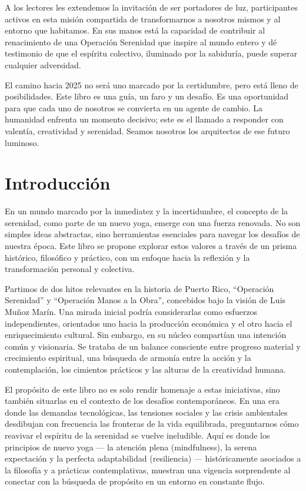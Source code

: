 \documentclass[
]{book}
\begin{document}
A los lectores les extendemos la invitación de ser portadores de luz, participantes activos en esta misión compartida de transformarnos a nosotros mismos y al entorno que habitamos. En sus manos está la capacidad de contribuir al renacimiento de una Operación Serenidad que inspire al mundo entero y dé testimonio de que el espíritu colectivo, iluminado por la sabiduría, puede superar cualquier adversidad.

El camino hacia 2025 no será uno marcado por la certidumbre, pero está lleno de posibilidades. Este libro es una guía, un faro y un desafío. Es una oportunidad para que cada uno de nosotros se convierta en un agente de cambio. La humanidad enfrenta un momento decisivo; este es el llamado a responder con valentía, creatividad y serenidad. Seamos nosotros los arquitectos de ese futuro luminoso.

\chapter*{Introducción}\label{introducciuxf3n}

En un mundo marcado por la inmediatez y la incertidumbre, el concepto de la serenidad, como parte de un nuevo yoga, emerge con una fuerza renovada. No son simples ideas abstractas, sino herramientas esenciales para navegar los desafíos de nuestra época. Este libro se propone explorar estos valores a través de un prisma histórico, filosófico y práctico, con un enfoque hacia la reflexión y la transformación personal y colectiva.

Partimos de dos hitos relevantes en la historia de Puerto Rico, ``Operación Serenidad'' y ``Operación Manos a la Obra'', concebidos bajo la visión de Luis Muñoz Marín. Una mirada inicial podría considerarlas como esfuerzos independientes, orientados uno hacia la producción económica y el otro hacia el enriquecimiento cultural. Sin embargo, en su núcleo compartían una intención común y visionaria. Se trataba de un balance consciente entre progreso material y crecimiento espiritual, una búsqueda de armonía entre la acción y la contemplación, los cimientos prácticos y las alturas de la creatividad humana.

El propósito de este libro no es solo rendir homenaje a estas iniciativas, sino también situarlas en el contexto de los desafíos contemporáneos. En una era donde las demandas tecnológicas, las tensiones sociales y las crisis ambientales desdibujan con frecuencia las fronteras de la vida equilibrada, preguntarnos cómo reavivar el espíritu de la serenidad se vuelve ineludible. Aquí es donde los principios de nuevo yoga --- la atención plena (mindfulness), la serena expectación y la perfecta adaptabilidad (resiliencia) --- históricamente asociados a la filosofía y a prácticas contemplativas, muestran una vigencia sorprendente al conectar con la búsqueda de propósito en un entorno en constante flujo.
\end{document}
